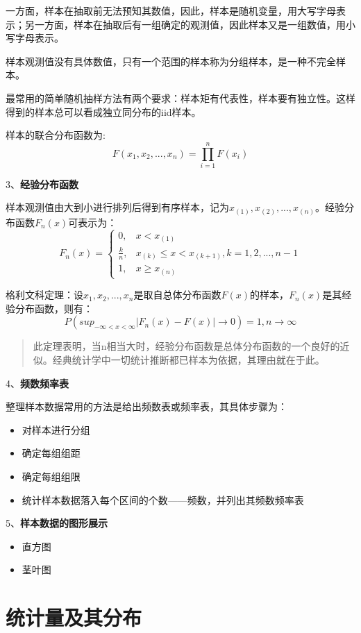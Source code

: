 \documentclass[
]{book}
\begin{document}
一方面，样本在抽取前无法预知其数值，因此，样本是随机变量，用大写字母表示；另一方面，样本在抽取后有一组确定的观测值，因此样本又是一组数值，用小写字母表示。

样本观测值没有具体数值，只有一个范围的样本称为分组样本，是一种不完全样本。

最常用的简单随机抽样方法有两个要求：样本矩有代表性，样本要有独立性。这样得到的样本总可以看成独立同分布的iid样本。

样本的联合分布函数为:
\[
F(x_1,x_2,...,x_n)=\prod_{i=1}^nF(x_i)
\]

3、\textbf{经验分布函数}

样本观测值由大到小进行排列后得到有序样本，记为\(x_{(1)},x_{(2)},...,x_{(n)}\)。经验分布函数\(F_n(x)\)可表示为：
\[
F_n(x)=\begin{cases}
0,&x<x_{(1)}\\
\frac{k}{n},&x_{(k)}\leq x<x_{(k+1)},k=1,2,...,n-1\\
1,&x\geq x_{(n)}
\end{cases}
\]

格利文科定理：设\(x_1,x_2,...,x_n\)是取自总体分布函数\(F(x)\)的样本，\(F_n(x)\)是其经验分布函数，则有：
\[
P(sup_{-\infty<x<\infty}|F_n(x)-F(x)|\rightarrow0)=1,n\rightarrow\infty
\]

\begin{quote}
此定理表明，当n相当大时，经验分布函数是总体分布函数的一个良好的近似。经典统计学中一切统计推断都已样本为依据，其理由就在于此。
\end{quote}

4、\textbf{频数频率表}

整理样本数据常用的方法是给出频数表或频率表，其具体步骤为：

\begin{itemize}
\item
  对样本进行分组
\item
  确定每组组距
\item
  确定每组组限
\item
  统计样本数据落入每个区间的个数------频数，并列出其频数频率表
\end{itemize}

5、\textbf{样本数据的图形展示}

\begin{itemize}
\item
  直方图
\item
  茎叶图
\end{itemize}

\section{统计量及其分布}\label{ux7edfux8ba1ux91cfux53caux5176ux5206ux5e03}
\end{document}
